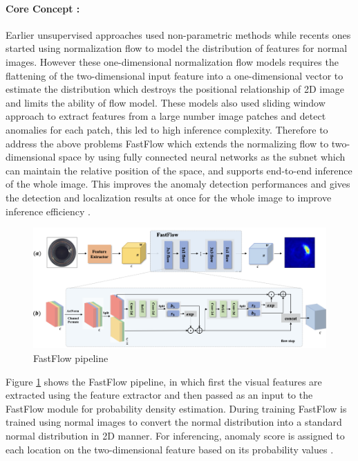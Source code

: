 \paragraph*{Core Concept :}

Earlier unsupervised approaches used non-parametric methods while recents ones started using normalization flow to model the distribution of features for normal images. However these one-dimensional normalization flow models  requires the flattening of the two-dimensional input feature into a one-dimensional vector to estimate the distribution which destroys the positional relationship of 2D image and limits the ability of flow model. These models also used sliding window approach to extract features from a large number image patches and detect anomalies for each patch, this led to high inference complexity. Therefore to address the above problems FastFlow which extends the normalizing flow to two-dimensional space by using fully connected neural networks as the subnet which can maintain the relative position of the space, and supports end-to-end inference of the whole image. This improves the anomaly detection performances and gives the detection and localization results at once for the whole image to improve inference efficiency \cite{yu2021fastflowunsupervisedanomalydetection}.

\begin{figure}[ht!]
    \centering
    \includegraphics[width=1.1\linewidth]{Rohit_Master_Thesis//Images/fastflow_pipeline.png}
    \caption{FastFlow pipeline\cite{yu2021fastflowunsupervisedanomalydetection}}
    \label{fig:fastflow pipeline}
\end{figure}

Figure \ref{fig:fastflow pipeline} shows the FastFlow pipeline, in which first the visual features are extracted using the feature extractor and then passed as an input to the FastFlow module for probability density estimation. During training FastFlow is trained using normal images to convert the normal distribution into a standard normal distribution in 2D manner. For inferencing, anomaly score is assigned  to each location on the two-dimensional feature based on its probability values \cite{yu2021fastflowunsupervisedanomalydetection}.

